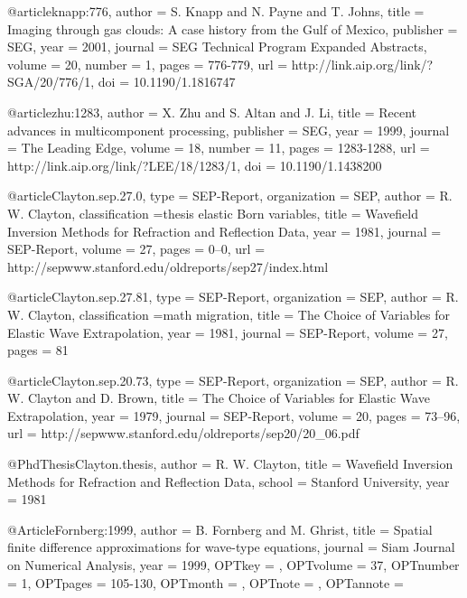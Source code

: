 {@article{knapp:776,
  author =	 {S. Knapp and N. Payne and T. Johns},
  title =	 {Imaging through gas clouds: A case history from the
                  Gulf of Mexico},
  publisher =	 {SEG},
  year =	 2001,
  journal =	 {SEG Technical Program Expanded Abstracts},
  volume =	 20,
  number =	 1,
  pages =	 {776-779},
  url =		 {http://link.aip.org/link/?SGA/20/776/1},
  doi =		 {10.1190/1.1816747}
}

@article{zhu:1283,
  author =	 {X. Zhu and S. Altan and J. Li},
  title =	 {Recent advances in multicomponent processing},
  publisher =	 {SEG},
  year =	 1999,
  journal =	 {The Leading Edge},
  volume =	 18,
  number =	 11,
  pages =	 {1283-1288},
  url =		 {http://link.aip.org/link/?LEE/18/1283/1},
  doi =		 {10.1190/1.1438200}
}

@article{Clayton.sep.27.0,
  type =	 {SEP-Report},
  organization = {SEP},
  author =	 {R. W. Clayton},
  classification ={thesis elastic {Born} variables},
  title =	 {Wavefield Inversion Methods for Refraction and
                  Reflection Data},
  year =	 1981,
  journal =	 {SEP-Report},
  volume =	 27,
  pages =	 {0--0},
  url =
                  {http://sepwww.stanford.edu/oldreports/sep27/index.html}
}

@article{Clayton.sep.27.81,
  type =	 {SEP-Report},
  organization = {SEP},
  author =	 {R. W. Clayton},
  classification ={math migration},
  title =	 {The Choice of Variables for Elastic Wave
                  Extrapolation},
  year =	 1981,
  journal =	 {SEP-Report},
  volume =	 27,
  pages =	 81
}

@article{Clayton.sep.20.73,
  type =	 {SEP-Report},
  organization = {SEP},
  author =	 {R. W. Clayton and D. Brown},
  title =	 {The Choice of Variables for Elastic Wave
                  Extrapolation},
  year =	 1979,
  journal =	 {SEP-Report},
  volume =	 20,
  pages =	 {73--96},
  url =
                  {http://sepwww.stanford.edu/oldreports/sep20/20_06.pdf}
}

@PhdThesis{Clayton.thesis,
  author =	 {R. W. Clayton},
  title =	 {Wavefield Inversion Methods for Refraction and
                  Reflection Data},
  school =	 {Stanford University},
  year =	 1981
}

@Article{Fornberg:1999,
  author = 	 {B. Fornberg and M. Ghrist},
  title = 	 {Spatial finite difference approximations for
                  wave-type equations},
  journal = 	 {Siam Journal on Numerical Analysis},
  year = 	 {1999},
  OPTkey = 	 {},
  OPTvolume = 	 {37},
  OPTnumber = 	 {1},
  OPTpages = 	 {105-130},
  OPTmonth = 	 {},
  OPTnote = 	 {},
  OPTannote = 	 {}
}

}

